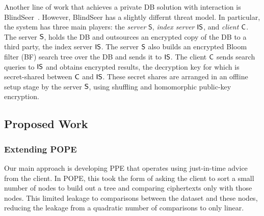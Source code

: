 Another line of work that achieves a private DB solution with interaction is
BlindSeer~\cite{SP:PKVKMC14,SP:FVKKKM15}. However, BlindSeer has a slightly
differnt threat model. In particular, the system has three main players: the
\emph{server} $\mathsf{S}$, {\em index server} $\sf IS$, and {\em client} $\sf
C$. The server $\sf S$, holds the DB and outsources an encrypted copy of the DB
to a third party, the index server $\sf IS$. The server $\sf S$  also builds an
encrypted Bloom filter (BF) search tree over the DB and sends it to $\sf IS$.
The client $\sf C$ sends search queries to $\sf IS$ and obtains encrypted
results, the decryption key for which is secret-shared between $\sf C$ and $\sf
IS$. These secret shares are arranged in an offline setup stage by the server
$\sf S$, using shuffling and homomorphic public-key encryption. 



\subsection{Proposed Work}
\subsubsection{Extending POPE}
Our main approach is developing PPE that operates using just-in-time
advice from the client.  In POPE, this took the form of asking the client to
sort a small number of nodes to build out a tree and comparing ciphertexts only
with those nodes.  This limited leakage to comparisons between the dataset and
these nodes, reducing the leakage from a quadratic number of
comparisons to only linear.

